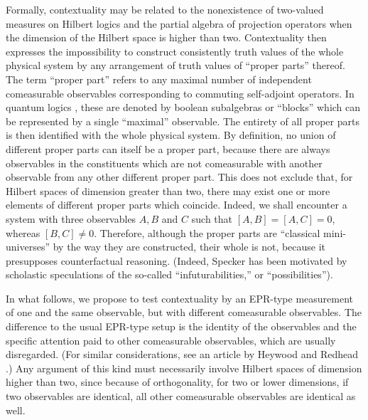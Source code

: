Formally, contextuality may be related to the nonexistence of two-valued
measures on Hilbert logics
\cite{birkhoff-36,kamber65,ZirlSchl-65,kochen1,svozil-tkadlec,svozil-ql} and
the partial algebra of projection operators \cite{kochen2,kochen3} when
the dimension of the Hilbert space is higher than two.
Contextuality then expresses the impossibility to
construct consistently truth values of the whole physical system
by any arrangement of truth values of ``proper parts'' thereof.
The term ``proper
part'' refers to any maximal number of independent comeasurable observables
corresponding to commuting self-adjoint operators. In quantum logics
\cite{kalmbach-83,pulmannova-91}, these are denoted by boolean
subalgebras or
``blocks'' which can be represented by a single ``maximal'' observable.
The entirety of
all proper parts is then identified with the whole physical system. By
definition, no union of different proper parts can itself be a proper
part, because there are always observables in the constituents which
are not comeasurable with another observable from any other different
proper part. This does not exclude that, for Hilbert spaces of dimension
greater than two,
there may exist one or more elements of different proper parts which
coincide.
Indeed, we shall encounter a system with three observables $A,B$ and $C$
such that $[A,B]=[A,C]=0$, whereas $[B,C]\neq 0$.
Therefore, although the proper parts are
``classical
mini-universes'' by the way they are constructed, their whole is not,
because it presupposes
counterfactual reasoning. (Indeed, Specker
\cite[in German]{specker-60}
has been motivated by
scholastic speculations of the so-called ``infuturabilities,'' or
``possibilities'').



In what follows, we propose to test contextuality by an EPR-type
measurement of one and the same observable, but with different
comeasurable observables. The difference to the usual EPR-type setup is
the identity of the observables and the specific attention paid to
other comeasurable observables, which are usually disregarded.
(For similar considerations, see an article by Heywood and Redhead \cite{hey-red}.)
Any argument of this kind must necessarily involve Hilbert spaces of
dimension higher than two, since because of orthogonality, for two or
lower dimensions,
if two observables are identical, all other comeasurable observables are
identical as well.

